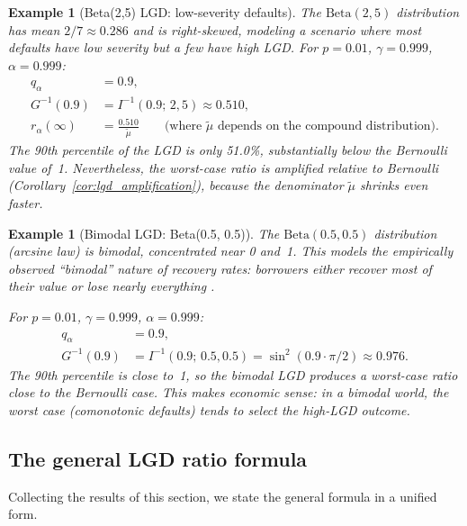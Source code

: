 \documentclass[11pt]{article}
\newtheorem{example}[theorem]{Example}
\theoremstyle{definition}
\newcommand{\1}{\mathbf{1}}
\begin{document}
\begin{example}[Beta(2,5) LGD: low-severity defaults]\label{ex:beta_25_lgd}
The $\mathrm{Beta}(2,5)$ distribution has mean $2/7 \approx 0.286$ and is right-skewed, modeling a scenario where most defaults have low severity but a few have high LGD. For $p = 0.01$, $\gamma = 0.999$, $\alpha = 0.999$:
\begin{align*}
  q_\alpha &= 0.9, \\
  G^{-1}(0.9) &= I^{-1}(0.9;\, 2, 5) \approx 0.510, \\
  r_\alpha(\infty) &= \frac{0.510}{\tilde{\mu}} \qquad\text{(where $\tilde{\mu}$ depends on the compound distribution)}.
\end{align*}
The 90th percentile of the LGD is only 51.0\%, substantially below the Bernoulli value of~1. Nevertheless, the worst-case ratio is \emph{amplified} relative to Bernoulli (Corollary~\ref{cor:lgd_amplification}), because the denominator $\tilde{\mu}$ shrinks even faster.
\end{example}

\begin{example}[Bimodal LGD: Beta(0.5, 0.5)]\label{ex:bimodal_lgd}
The $\mathrm{Beta}(0.5, 0.5)$ distribution (arcsine law) is bimodal, concentrated near 0 and~1. This models the empirically observed ``bimodal'' nature of recovery rates: borrowers either recover most of their value or lose nearly everything \citep{McNeilEtAl2015}.

For $p = 0.01$, $\gamma = 0.999$, $\alpha = 0.999$:
\begin{align*}
  q_\alpha &= 0.9, \\
  G^{-1}(0.9) &= I^{-1}(0.9;\, 0.5, 0.5) = \sin^2(0.9 \cdot \pi/2) \approx 0.976.
\end{align*}
The 90th percentile is close to~1, so the bimodal LGD produces a worst-case ratio close to the Bernoulli case. This makes economic sense: in a bimodal world, the worst case (comonotonic defaults) tends to select the high-LGD outcome.
\end{example}

\subsection{The general LGD ratio formula}\label{sec:lgd_general}

Collecting the results of this section, we state the general formula in a unified form.
\end{document}
